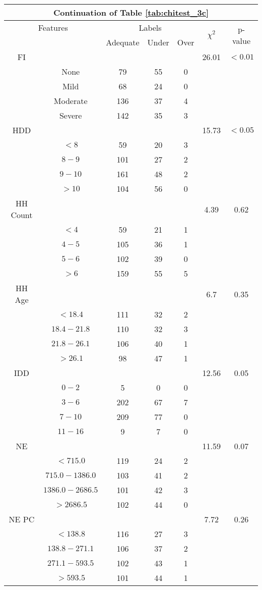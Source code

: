 \begin{table}
\centering
\label{tab:chitest_3c_cont}
\begin{tabular}{c c | c c c| c | c}
\hline
\multicolumn{7}{c}{Continuation of Table \ref{tab:chitest_3c}}\\ 
\hline
\multicolumn{2}{c|}{Features}& \multicolumn{3}{c|}{Labels}& \multirow{2}{*}{$\chi^2$} & \multirow{2}{*}{p-value}\\ 
& & Adequate & Under & Over & & \\ 
\hline
FI &  &  &  & & 26.01 & $< 0.01$ \\ 
& None & 79 & 55 & 0& & \\ 
& Mild & 68 & 24 & 0& & \\ 
& Moderate & 136 & 37 & 4& & \\ 
& Severe & 142 & 35 & 3& & \\ 
\hline 
HDD &  &  &  & & 15.73 & $< 0.05$ \\ 
& $< 8$ & 59 & 20 & 3& & \\ 
& $8-9$ & 101 & 27 & 2& & \\ 
& $9-10$ & 161 & 48 & 2& & \\ 
& $> 10$ & 104 & 56 & 0& & \\ 
\hline 
HH Count &  &  &  & & 4.39 & 0.62 \\ 
& $< 4$ & 59 & 21 & 1& & \\ 
& $4-5$ & 105 & 36 & 1& & \\ 
& $5-6$ & 102 & 39 & 0& & \\ 
& $> 6$ & 159 & 55 & 5& & \\ 
\hline 
HH Age &  &  &  & & 6.7 & 0.35 \\ 
& $< 18.4$ & 111 & 32 & 2& & \\ 
& $18.4-21.8$ & 110 & 32 & 3& & \\ 
& $21.8-26.1$ & 106 & 40 & 1& & \\ 
& $> 26.1$ & 98 & 47 & 1& & \\ 
\hline 
IDD &  &  &  & & 12.56 & 0.05 \\ 
& $0-2$ & 5 & 0 & 0& & \\ 
& $3-6$ & 202 & 67 & 7& & \\ 
& $7-10$ & 209 & 77 & 0& & \\ 
& $11-16$ & 9 & 7 & 0& & \\ 
\hline 
NE &  &  &  & & 11.59 & 0.07 \\ 
& $< 715.0$ & 119 & 24 & 2& & \\ 
& $715.0-1386.0$ & 103 & 41 & 2& & \\ 
& $1386.0-2686.5$ & 101 & 42 & 3& & \\ 
& $> 2686.5$ & 102 & 44 & 0& & \\ 
\hline 
NE PC &  &  &  & & 7.72 & 0.26 \\ 
& $< 138.8$ & 116 & 27 & 3& & \\ 
& $138.8-271.1$ & 106 & 37 & 2& & \\ 
& $271.1-593.5$ & 102 & 43 & 1& & \\ 
& $> 593.5$ & 101 & 44 & 1& & \\ 
\hline 
\end{tabular}
\end{table}

